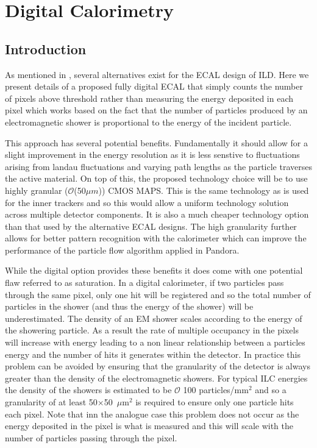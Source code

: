 \chapter{Digital Calorimetry}
\label{sect:DECAL}

\section{Introduction}
As mentioned in , several alternatives exist for the \ac{ECAL} design of \ac{ILD}. Here we present details of a proposed fully digital \ac{ECAL} that simply counts the number of pixels above threshold rather than measuring the energy deposited in each pixel which works based on the fact that the number of particles produced by an electromagnetic shower is proportional to the energy of the incident particle.

This approach has several potential benefits. Fundamentally it should allow for a slight improvement in the energy resolution as it is less senstive to fluctuations arising from landau fluctuations and varying path lengths as the particle traverses the active material. On top of this, the proposed technology choice will be to use highly granular ($\mathcal{O}$(50$\mu m$)) \ac{CMOS} \ac{MAPS}. This is the same technology as is used for the inner trackers and so this would allow a uniform technology solution across multiple detector components. It is also a much cheaper technology option than that used by the alternative \ac{ECAL} designs. The high granularity further allows for better pattern recognition with the calorimeter which can improve the performance of the particle flow algorithm applied in Pandora.

While the digital option provides these benefits it does come with one potential flaw referred to as saturation. In a digital calorimeter, if two particles pass through the same pixel, only one hit will be registered and so the total number of particles in the shower (and thus the energy of the shower) will be underestimated. The density of an EM shower scales according to the energy of the showering particle. As a result the rate of multiple occupancy in the pixels will increase with energy leading to a non linear relationship between a particles energy and the number of hits it generates within the detector. In practice this problem can be avoided by ensuring that the granularity of the detector is always greater than the density of the electromagnetic showers. For typical \ac{ILC} energies the density of the showers is estimated to be $\mathcal{O}$ 100 particles/mm$^2$ and so a granularity of at least 50$\times$50~$\mu$m$^2$ is required to ensure only one particle hits each pixel. Note that inn the analogue case this problem does not occur as the energy deposited in the pixel is what is measured and this will scale with the number of particles passing through the pixel.

